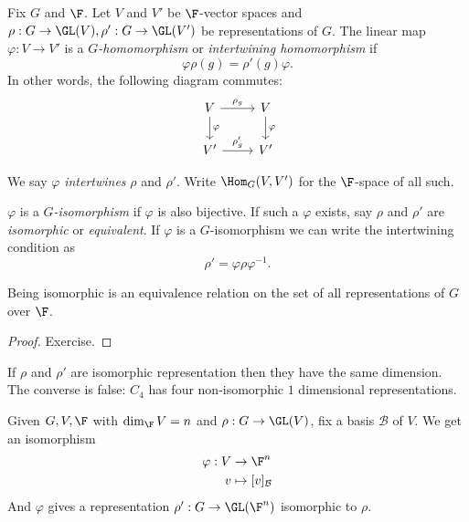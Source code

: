 \documentclass[a4paper]{article}
\begin{document}
\begin{definition}
  Fix \(G\) and \(\F\). Let \(V\) and \(V'\) be \(\F\)-vector spaces and \(\rho: G \to \GL(V), \rho': G \to \GL(V')\) be representations of \(G\). The linear map \(\varphi: V \to V'\) is a \emph{\(G\)-homomorphism} or \emph{intertwining homomorphism} if
  \[
    \varphi \rho(g) = \rho'(g) \varphi.
  \]
  In other words, the following diagram commutes:
  \[
    \begin{tikzcd}
      V \ar[r, "\rho_g"] \ar[d, "\varphi"] & V \ar[d, "\varphi"] \\
      V' \ar[r, "\rho_g'"] & V'
    \end{tikzcd}
  \]

  We say \(\varphi\) \emph{intertwines} \(\rho\) and \(\rho'\). Write \(\Hom_G(V, V')\) for the \(\F\)-space of all such.

  \(\varphi\) is a \emph{\(G\)-isomorphism} if \(\varphi\) is also bijective. If such a \(\varphi\) exists, say \(\rho\) and \(\rho'\) are \emph{isomorphic} or \emph{equivalent}. If \(\varphi\) is a \(G\)-isomorphism we can write the intertwining condition as
  \[
    \rho' = \varphi \rho \varphi^{-1}.
  \]
\end{definition}

\begin{lemma}
  Being isomorphic is an equivalence relation on the set of all representations of \(G\) over \(\F\).
\end{lemma}

\begin{proof}
  Exercise.
\end{proof}

\begin{remark}
  If \(\rho\) and \(\rho'\) are isomorphic representation then they have the same dimension. The converse is false:  \(C_4\) has four non-isomorphic \(1\) dimensional representations.
\end{remark}

\begin{remark}
  Given \(G, V, \F\) with \(\dim_\F V = n\) and \(\rho: G \to \GL(V)\), fix a basis \(\mathcal B\) of \(V\). We get an isomorphism
  \begin{align*}
    \varphi: V &\to \F^n \\
    v &\mapsto [v]_{\mathcal B}
  \end{align*}
  And \(\varphi\) gives a representation \(\rho': G \to \GL(\F^n)\) isomorphic to \(\rho\).
\end{remark}
\end{document}
